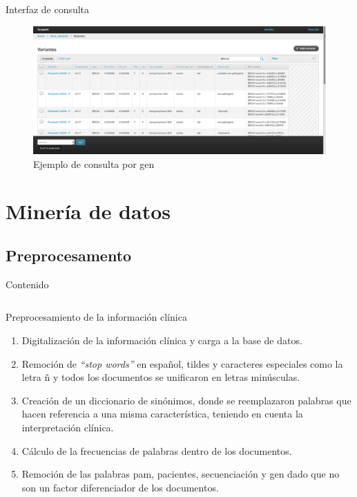 \documentclass[xcolor=dvipsnames]{beamer}
\begin{document}
\begin{frame}{Interfaz de consulta}
	\begin{figure}
		\includegraphics[width=\textwidth]{consulta}
		\caption{Ejemplo de consulta por gen}
	\end{figure}
\end{frame}
\section{Minería de datos}
\subsection{Preprocesamento}
    \begin{frame}{Contenido}
    \begin{columns}[onlytextwidth,T]
        \begin{column}{.55\textwidth}
            \tableofcontents[currentsection, sections=1-3]
        \end{column}
        \begin{column}{.60\textwidth}
            \tableofcontents[currentsection, sections=4-]
        \end{column}
    \end{columns}
\end{frame}


\begin{frame}{Preprocesamiento de la información clínica}
   	\begin{enumerate}[1.]
   	
		\justifying 
		\item  Digitalización de la información clínica y carga a la base de datos.
		\item Remoción de \textit{``stop words''} en español, tildes y caracteres especiales como la letra ñ y todos los documentos se unificaron en letras minúsculas.
		\item Creación de un diccionario de sinónimos, donde se reemplazaron palabras que hacen referencia a una misma característica, teniendo en cuenta la interpretación clínica. \item Cálculo de la frecuencias de palabras dentro de los documentos. 
		\item Remoción de las palabras pam, pacientes, secuenciación y gen dado que no son un factor diferenciador de los documentos.  
	   	\end{enumerate}

\end{frame}
\end{document}

